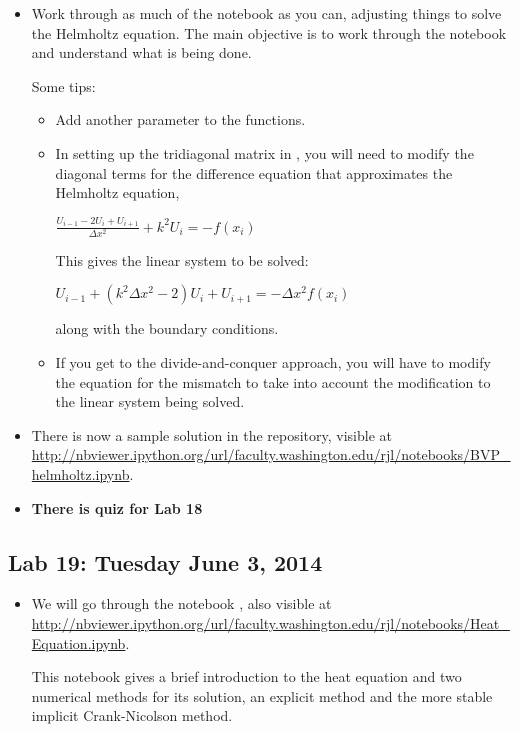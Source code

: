\documentclass[letterpaper,10pt,english]{sphinxmanual}
\begin{document}
\begin{itemize}
\item {} 
Work through as much of the notebook as you can, adjusting things to
solve the Helmholtz equation.  The main objective is to work through the
notebook and understand what is being done.

Some tips:
\begin{itemize}
\item {} 
Add another parameter  to the  functions.

\item {} 
In setting up the tridiagonal matrix in , you will need
to modify the diagonal terms for the difference equation that
approximates the Helmholtz equation,

\(\frac{U_{i-1} - 2U_i + U_{i+1}}{\Delta x^2} + k^2 U_i = -f(x_i)\)

This gives the linear system to be solved:

\(U_{i-1} + (k^2\Delta x^2 - 2) U_i + U_{i+1} = -\Delta x^2 f(x_i)\)

along with the boundary conditions.

\item {} 
If you get to the divide-and-conquer approach, you will have to modify
the equation for the mismatch to take into account the modification to
the linear system being solved.

\end{itemize}

\item {} 
There is now a sample solution in the repository, visible at
\url{http://nbviewer.ipython.org/url/faculty.washington.edu/rjl/notebooks/BVP\_helmholtz.ipynb}.

\item {} 
\textbf{There is quiz for Lab 18}

\end{itemize}


\subsection{Lab 19: Tuesday June 3, 2014}
\label{labs/lab19::doc}\label{labs/lab19:lab19}\label{labs/lab19:lab-19-tuesday-june-3-2014}\begin{itemize}
\item {} 
We will go through the notebook , also
visible at
\url{http://nbviewer.ipython.org/url/faculty.washington.edu/rjl/notebooks/Heat\_Equation.ipynb}.

This notebook gives a brief introduction to the heat equation and
two numerical methods for its solution, an explicit method and the
more stable implicit Crank-Nicolson method.

\end{itemize}
\end{document}
